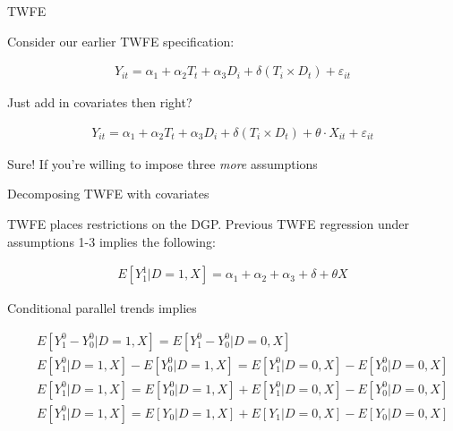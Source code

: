 \documentclass{beamer}
\begin{document}
\begin{frame}{TWFE}

Consider our earlier TWFE specification:

\begin{eqnarray*}
Y_{it} = \alpha_1  + \alpha_2 T_t + \alpha_3 D_i +  \delta (T_i \times D_t)  + \varepsilon_{it}
\end{eqnarray*}

\bigskip

Just add in covariates then right?

\begin{eqnarray*}
Y_{it} = \alpha_1  + \alpha_2 T_t + \alpha_3 D_i  + \delta (T_i \times D_t) + \theta \cdot X_{it} + \varepsilon_{it}
\end{eqnarray*}

Sure! If you're willing to impose three \emph{more} assumptions

\end{frame}




\begin{frame}{Decomposing TWFE with covariates}

TWFE places restrictions on the DGP. Previous TWFE regression under assumptions 1-3 implies the following:

\bigskip

\begin{eqnarray*}
E[Y^1_1|D=1,X] = \alpha_1 + \alpha_2 + \alpha_3 + \delta + \theta X
\end{eqnarray*}

\bigskip

Conditional parallel trends implies

\small
\begin{eqnarray*}
&&E[Y^0_{1} - Y^0_{0}|D=1,X]= E[Y^0_{1} - Y^0_{0}|D=0,X] \\
&&E[Y^0_{1}|D=1,X] - E[Y^0_{0}|D=1,X]= E[Y^0_{1}|D=0,X] - E[Y^0_{0}|D=0,X] \\
&&E[Y^0_{1}|D=1,X] = E[Y^0_{0}|D=1,X] + E[Y^0_{1}|D=0,X] - E[Y^0_{0}|D=0,X] \\
&&E[Y^0_{1}|D=1,X] = E[Y_{0}|D=1,X] + E[Y_{1}|D=0,X] - E[Y_{0}|D=0,X] \\
\end{eqnarray*}


\end{frame}
\end{document}
